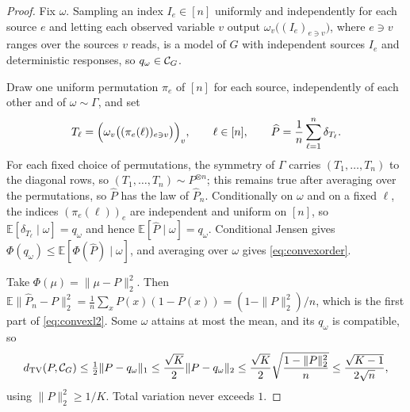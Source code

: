 \documentclass[11pt]{article}
\theoremstyle{plain}
\theoremstyle{definition}
\DeclareMathOperator{\TV}{TV}
\newcommand{\E}{\mathbb E}
\begin{document}
\begin{proof}
Fix $\omega$. Sampling an index $I_e\in[n]$ uniformly and independently for each source $e$ and letting each observed variable $v$ output $\omega_v\bigl((I_e)_{e\ni v}\bigr)$, where $e\ni v$ ranges over the sources $v$ reads, is a model of $G$ with independent sources $I_e$ and deterministic responses, so $q_\omega\in\mathcal C_{G}$.

Draw one uniform permutation $\pi_e$ of $[n]$ for each source, independently of each other and of $\omega\sim\Gamma$, and set
\[
T_\ell=\Bigl(\omega_v\bigl((\pi_e(\ell))_{e\ni v}\bigr)\Bigr)_{v},\qquad \ell\in[n],
\qquad \widehat P=\frac1n\sum_{\ell=1}^n\delta_{T_\ell}.
\]
For each fixed choice of permutations, the symmetry of $\Gamma$ carries $(T_1,\dots,T_n)$ to the diagonal rows, so $(T_1,\dots,T_n)\sim P^{\otimes n}$; this remains true after averaging over the permutations, so $\widehat P$ has the law of $\widehat P_n$. Conditionally on $\omega$ and on a fixed $\ell$, the indices $(\pi_e(\ell))_e$ are independent and uniform on $[n]$, so $\E[\delta_{T_\ell}\mid\omega]=q_\omega$ and hence $\E[\widehat P\mid\omega]=q_\omega$. Conditional Jensen gives $\Phi(q_\omega)\le\E[\Phi(\widehat P)\mid\omega]$, and averaging over $\omega$ gives \eqref{eq:convexorder}.

Take $\Phi(\mu)=\|\mu-P\|_2^2$. Then $\E\|\widehat P_n-P\|_2^2=\frac1n\sum_xP(x)(1-P(x))=(1-\|P\|_2^2)/n$, which is the first part of \eqref{eq:convexl2}. Some $\omega$ attains at most the mean, and its $q_\omega$ is compatible, so
\[
d_{\TV}(P,\Cscen{G})\le\tfrac12\|P-q_\omega\|_1\le\frac{\sqrt K}2\|P-q_\omega\|_2\le\frac{\sqrt K}2\sqrt{\frac{1-\|P\|_2^2}n}\le\frac{\sqrt{K-1}}{2\sqrt n},
\]
using $\|P\|_2^2\ge1/K$. Total variation never exceeds $1$.
\end{proof}
\end{document}
